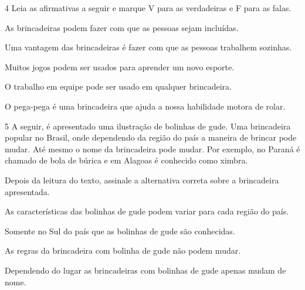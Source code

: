 \num{4} Leia as afirmativas a seguir e marque V para as verdadeiras e F para
  as falas.

\begin{boxlist}
\item As brincadeiras podem fazer com que as pessoas sejam incluídas. 

\item Uma vantagem das brincadeiras é fazer com que as pessoas trabalhem sozinhas. 

\item Muitos jogos podem ser usados para aprender um novo esporte. 

\item O trabalho em equipe pode ser usado em qualquer brincadeira. 

\item O pega-pega é uma brincadeira que ajuda a nossa habilidade motora de rolar. 
\end{boxlist}


\num{5} A seguir, é apresentado uma ilustração de bolinhas de gude. Uma
  brincadeira popular no Brasil, onde dependendo da região do país a
  maneira de brincar pode mudar. Até mesmo o nome da brincadeira pode
  mudar. Por exemplo, no Paraná é chamado de bola de búrica e em Alagoas
  é conhecido como ximbra.


Depois da leitura do texto, assinale a alternativa correta sobre a
brincadeira apresentada.

\begin{escolha}
\item
  As características das bolinhas de gude podem variar para cada região
  do país.
\item
  Somente no Sul do país que as bolinhas de gude são conhecidas.
\item
  As regras da brincadeira com bolinha de gude não podem mudar.
\item
  Dependendo do lugar as brincadeiras com bolinhas de gude apenas mudam
  de nome.
\end{escolha}

